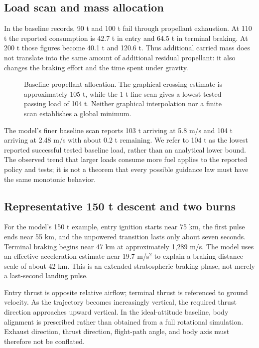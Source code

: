 \documentclass[11pt,a4paper]{article}
\begin{document}
\subsection{Load scan and mass allocation}


In the baseline records, 90 t and 100 t fail through propellant exhaustion. At 110 t the reported consumption is 42.7 t in entry and 64.5 t in terminal braking. At 200 t those figures become 40.1 t and 120.6 t. Thus additional carried mass does not translate into the same amount of additional residual propellant: it also changes the braking effort and the time spent under gravity.

\begin{figure}[htbp]
\centering\SourceFuelPlot
\caption{Baseline propellant allocation. The graphical crossing estimate is approximately 105 t, while the 1 t fine scan gives a lowest tested passing load of 104 t. Neither graphical interpolation nor a finite scan establishes a global minimum.}
\label{fig:fuel}
\end{figure}

The model's finer baseline scan reports 103 t arriving at 5.8 m/s and 104 t arriving at 2.48 m/s with about 0.2 t remaining. We refer to 104 t as the lowest reported successful tested baseline load, rather than an analytical lower bound. The observed trend that larger loads consume more fuel applies to the reported policy and tests; it is not a theorem that every possible guidance law must have the same monotonic behavior.

\subsection{Representative 150 t descent and two burns}


For the model's 150 t example, entry ignition starts near 75 km, the first pulse ends near 55 km, and the unpowered transition lasts only about seven seconds. Terminal braking begins near 47 km at approximately 1,289 m/s. The model uses an effective acceleration estimate near 19.7 m/s$^2$ to explain a braking-distance scale of about 42 km. This is an extended stratospheric braking phase, not merely a last-second landing pulse.




Entry thrust is opposite relative airflow; terminal thrust is referenced to ground velocity. As the trajectory becomes increasingly vertical, the required thrust direction approaches upward vertical. In the ideal-attitude baseline, body alignment is prescribed rather than obtained from a full rotational simulation. Exhaust direction, thrust direction, flight-path angle, and body axis must therefore not be conflated.
\end{document}
